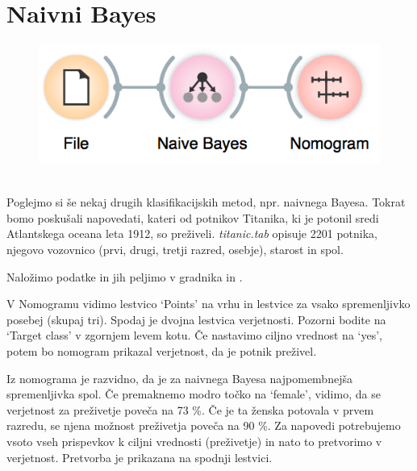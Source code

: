 \chapter{Naivni Bayes}
\label{ch:naivni-bayes}

\begin{figure}
    \includegraphics[scale=0.7]{workflow.png}
    \caption{$\;$}
\end{figure}

Poglejmo si še nekaj drugih klasifikacijskih metod, npr. naivnega Bayesa. Tokrat bomo poskušali napovedati, kateri od potnikov Titanika, ki je potonil sredi Atlantskega oceana leta 1912, so preživeli. \textit{titanic.tab} opisuje 2201 potnika, njegovo vozovnico (prvi, drugi, tretji razred, osebje), starost in spol.

Naložimo podatke in jih peljimo v gradnika  in .

V Nomogramu vidimo lestvico ‘Points’ na vrhu in lestvice za vsako spremenljivko posebej (skupaj tri). Spodaj je dvojna lestvica verjetnosti. Pozorni bodite na ‘Target class’ v zgornjem levem kotu. Če nastavimo ciljno vrednost na ‘yes’, potem bo nomogram prikazal verjetnost, da je potnik preživel.

Iz nomograma je razvidno, da je za naivnega Bayesa najpomembnejša spremenljivka spol. Če premaknemo modro točko na ‘female’, vidimo, da se verjetnost za preživetje poveča na 73 \%. Če je ta ženska potovala v prvem razredu, se njena možnost preživetja poveča na 90 \%. Za napovedi potrebujemo vsoto vseh prispevkov k ciljni vrednosti (preživetje) in nato to pretvorimo v verjetnost. Pretvorba je prikazana na spodnji lestvici.

